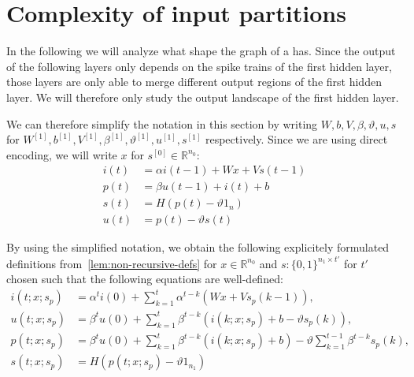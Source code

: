 \section{Complexity of input partitions}
\label{ch:partitions}

In the following we will analyze what shape the graph of a \dtlifsnn has.
Since the output of the following layers only depends on the spike trains of the first hidden layer, those layers are only able to merge different output regions of the first hidden layer. We will therefore only study the output landscape of the first hidden layer.

We can therefore simplify the notation in this section by writing \(W,b,V,β,ϑ,u,s\) for \(W^{[1]},b^{[1]},V^{[1]},β^{[1]},ϑ^{[1]},u^{[1]},s^{[1]}\) respectively. Since we are using direct encoding, we will write \(x\) for \(s^{[0]}∈ℝ^{n_0}\):
  \begin{align}
    i(t) & = αi(t-1)+Wx+Vs(t-1) \\
    p(t) & = βu(t-1)+i(t)+b \\
    s(t) & = H(p(t)-ϑ1_n) \\
    u(t) & = p(t)-ϑs(t)
  \end{align}

By using the simplified notation, we obtain the following explicitely formulated definitions from~\autoref{lem:non-recursive-defs} for \(x∈ℝ^{n_0}\) and \(s:\{0,1\}^{n_1×t'}\) for \(t'\) chosen such that the following equations are well-defined:
\begin{align}
    i(t;x;s_p) &= α^ti(0)+\sum_{k=1}^tα^{t-k}\left(Wx+Vs_p(k-1)\right), \\\label{eq:1}
    u(t;x;s_p) &= β^tu(0)+\sum_{k=1}^tβ^{t-k}\left(i(k;x;s_p)+b-ϑs_p(k)\right), \\\label{eq:2}
    p(t;x;s_p) &= β^tu(0)+\sum_{k=1}^tβ^{t-k}\left(i(k;x;s_p)+b\right)-ϑ\sum_{k=1}^{t-1}β^{t-k}s_p(k), \\
    s(t;x;s_p) &= H(p(t;x;s_p)-ϑ1_{n_1})
\end{align}

